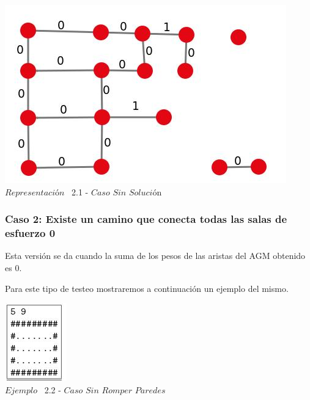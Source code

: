 \vspace*{0.3cm} \vspace*{0.3cm}
  \begin{center}
 \includegraphics[scale=0.5]{./EJ2/ej2grafosinsolucion.jpeg}
 \\{$Representación$ \ 2.1 - $Caso$ $Sin$ $Soluci$\'on}
  \end{center}
  \vspace*{0.3cm}



 \begin{center}
 \subsubsection*{Caso 2: Existe un camino que conecta todas las salas de esfuerzo 0}
\end{center}

Esta versi\'on se da cuando la suma de los pesos de las aristas del AGM obtenido es 0. 

Para este tipo de testeo mostraremos a continuaci\'on un ejemplo del mismo.\\

\vspace*{0.3cm} \vspace*{0.3cm}
  \begin{center}
 \includegraphics[scale=1.6]{./EJ2/ej2sinpared.jpeg}
 \\{$Ejemplo$ \ 2.2 - $Caso$ $Sin$ $Romper$ $Paredes$}
  \end{center}
  \vspace*{0.3cm}

